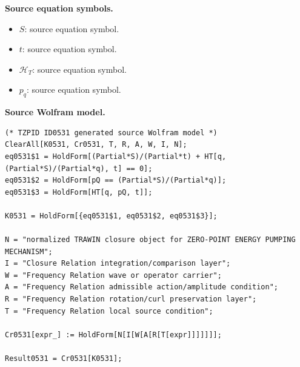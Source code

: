 \begin{minipage}[t]{0.49\linewidth}
\begingroup
\small
\raggedright
\textbf{Source equation symbols.}\par
\begin{itemize}[leftmargin=1.35em,itemsep=1pt,topsep=1pt,parsep=0pt]
    \item $S$: source equation symbol.
    \item $t$: source equation symbol.
    \item $\mathcal{H}_T$: source equation symbol.
    \item $p_q$: source equation symbol.
\end{itemize}
\endgroup
\end{minipage}\hfill
\begin{minipage}[t]{0.47\linewidth}
\begingroup
\scriptsize
\raggedright
\textbf{Source Wolfram model.}\par
\begin{Verbatim}[fontsize=\tiny,breaklines=true,breakanywhere=true]
(* TZPID ID0531 generated source Wolfram model *)
ClearAll[K0531, Cr0531, T, R, A, W, I, N];
eq0531$1 = HoldForm[(Partial*S)/(Partial*t) + HT[q, (Partial*S)/(Partial*q), t] == 0];
eq0531$2 = HoldForm[pQ == (Partial*S)/(Partial*q)];
eq0531$3 = HoldForm[HT[q, pQ, t]];

K0531 = HoldForm[{eq0531$1, eq0531$2, eq0531$3}];

N = "normalized TRAWIN closure object for ZERO-POINT ENERGY PUMPING MECHANISM";
I = "Closure Relation integration/comparison layer";
W = "Frequency Relation wave or operator carrier";
A = "Frequency Relation admissible action/amplitude condition";
R = "Frequency Relation rotation/curl preservation layer";
T = "Frequency Relation local source condition";

Cr0531[expr_] := HoldForm[N[I[W[A[R[T[expr]]]]]]];

Result0531 = Cr0531[K0531];
\end{Verbatim}
\endgroup
\end{minipage}


